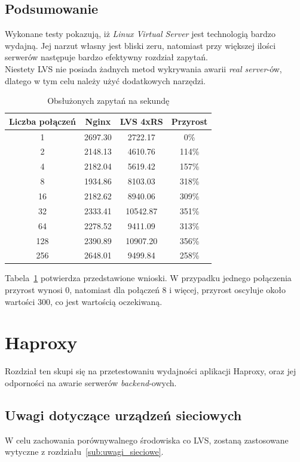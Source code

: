 \subsection{Podsumowanie}
Wykonane testy pokazują, iż \textit{Linux Virtual Server} jest technologią bardzo wydajną.
Jej narzut własny jest bliski zeru, natomiast przy większej ilości serwerów następuje bardzo efektywny rozdział zapytań.\\
Niestety LVS nie posiada żadnych metod wykrywania awarii \textit{real server}-ów, dlatego w tym celu należy użyć dodatkowych narzędzi.
\begin{table}[h]
\centering
\begin{tabular}{cccc}
	\toprule
	Liczba połączeń & Nginx & LVS 4xRS & Przyrost\\
	\midrule
	\midrule
	1&2697.30&2722.17&0\%\\
	\midrule
	2&2148.13&4610.76&114\%\\
	\midrule
	4&2182.04&5619.42&157\%\\
	\midrule
	8&1934.86&8103.03&318\%\\
	\midrule
	16&2182.62&8940.06&309\%\\
	\midrule
	32&2333.41&10542.87&351\%\\
	\midrule
	64&2278.52&9411.09&313\%\\
	\midrule
	128&2390.89&10907.20&356\%\\
	\midrule
	256&2648.01&9499.84&258\%\\
	\bottomrule
\end{tabular}
\caption{Obsłużonych zapytań na sekundę}
\label{tab:test_lvs}
\end{table}
Tabela~\ref{tab:test_lvs} potwierdza przedstawione wnioski.
W przypadku jednego połączenia przyrost wynosi 0, natomiast dla połączeń 8 i więcej, przyrost oscyluje około wartości 300, co jest wartością oczekiwaną.
\section{Haproxy}
Rozdział ten skupi się na przetestowaniu wydajności aplikacji Haproxy, oraz jej odporności na awarie serwerów \textit{backend}-owych.
\subsection{Uwagi dotyczące urządzeń sieciowych}
W celu zachowania porównywalnego środowiska co LVS, zostaną zastosowane wytyczne z rozdziału~\ref{sub:uwagi_sieciowe}.
